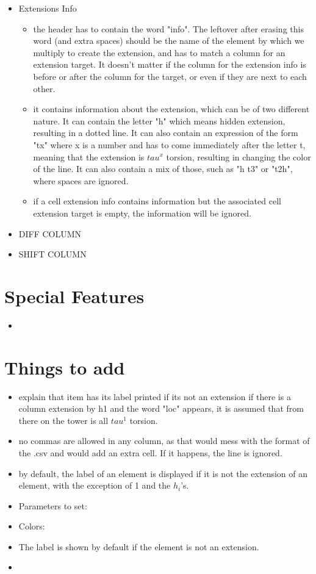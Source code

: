 \documentclass[a4paper,11pt]{article}
\begin{document}
\begin{itemize}
	
	\item{Extensions Info}
	\begin{itemize}
		\item the header has to contain the word "info". The leftover after erasing this word (and extra spaces) should be the name of the element by which we multiply to create the extension, and has to match a column for an extension target. It doesn't matter if the column for the extension info is before or after the column for the target, or even if they are next to each other.
		\item it contains information about the extension, which can be of two different nature. It can contain the letter "h" which means hidden extension, resulting in a dotted line. It can also contain an expression of the form "tx" where x is a number and has to come immediately after the letter t, meaning that the extension is $tau^x$ torsion, resulting in changing the color of the line. It can also contain a mix of those, such as "h t3" or "t2h", where spaces are ignored.
		\item if a cell extension info contains information but the associated cell extension target is empty, the information will be ignored.
	\end{itemize}
	\item{DIFF COLUMN}
	\item{SHIFT COLUMN}
\end{itemize}

\section{Special Features}
\begin{itemize}
\item 
\end{itemize}
	
\section{Things to add}
\begin{itemize}
\item explain that item has its label printed if its not an extension
if there is a column extension by h1 and the word "loc" appears, it is assumed that from there on the tower is all $tau^1$ torsion. 
\item no commas are allowed in any column, as that would mess with the format of the .csv and would add an extra cell. If it happens, the line is ignored.
\item by default, the label of an element is displayed if it is not the extension of an element, with the exception of 1 and the $h_i$'s.
	
\item Parameters to set:

\item Colors:
\item The label is shown by default if the element is not an extension. 
\item 
\end{itemize}
\end{document}
